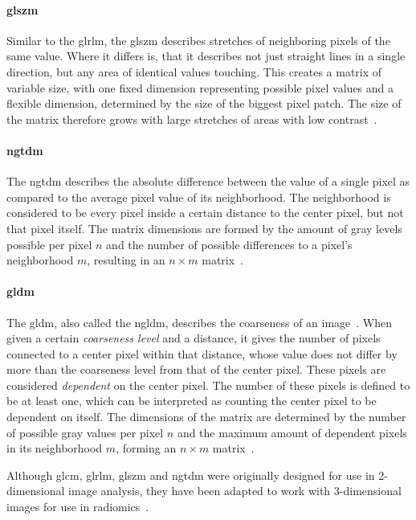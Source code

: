 \paragraph{\acl{glszm}} Similar to the \ac{glrlm}, the \ac{glszm} describes 
stretches of neighboring pixels of the same value. Where it differs is, that it
describes not just straight lines in a single direction, but any area of 
identical values touching. This creates a matrix of variable size, with one 
fixed dimension representing possible pixel values and a flexible dimension, 
determined by the size of the biggest pixel patch. The size of the matrix 
therefore grows with large stretches of areas with low contrast~\cite{py_rad_docs,textural_features}.

\paragraph{\acl{ngtdm}} The \ac{ngtdm} describes the absolute difference between the 
value of a single pixel as compared to the average pixel value of its 
neighborhood. The neighborhood is considered to be every pixel inside a certain distance
to the center pixel, but not that pixel itself. The matrix dimensions are formed
by the amount of gray levels possible per pixel $n$ and the number of possible 
differences to a pixel's neighborhood $m$, resulting in an $n \times m$ matrix~\cite{py_rad_docs,ibsi_reference_manual}.

\paragraph{\acl{gldm}} The \ac{gldm}, also called the \ac{ngldm}, describes the
coarseness of an image~\cite[REKO]{ibsi_reference_manual}. When given a certain 
\textit{coarseness level} and a distance, it gives the number of pixels connected
to a center pixel within that distance, whose value does not differ by more than
the coarseness level from that of the center pixel. These pixels are considered 
\textit{dependent} on the center pixel. The number of these pixels is defined to be 
at least one, which can be interpreted as counting the center pixel to be 
dependent on itself. The dimensions of the matrix are determined by the number 
of possible gray values per pixel $n$ and the maximum amount of dependent pixels
in its neighborhood $m$, forming an $n \times m$ matrix~\cite{ibsi_reference_manual,py_rad_docs}.

Although \ac{glcm}, \ac{glrlm}, \ac{glszm} and \ac{ngtdm} were originally 
designed for use in 2-dimensional image analysis, they have been adapted to work
with 3-dimensional images for use in radiomics~\cite{ibsi_reference_manual,textural_features}.

